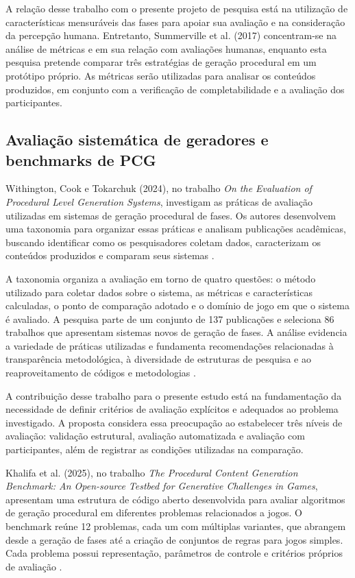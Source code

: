 A relação desse trabalho com o presente projeto de 
pesquisa está na utilização de características mensuráveis 
das fases para apoiar sua avaliação e na consideração 
da percepção humana. Entretanto, Summerville et al. (2017) 
concentram-se na análise de métricas e em sua relação com
avaliações humanas, enquanto esta pesquisa pretende comparar 
três estratégias de geração procedural em um protótipo próprio.
As métricas serão utilizadas para analisar os conteúdos
produzidos, em conjunto com a verificação de completabilidade 
e a avaliação dos participantes.

\subsection{Avaliação sistemática de geradores e benchmarks de PCG}

Withington, Cook e Tokarchuk (2024), no trabalho
\textit{On the Evaluation of Procedural Level Generation
Systems}, investigam as práticas de avaliação utilizadas em
sistemas de geração procedural de fases. Os autores
desenvolvem uma taxonomia para organizar essas práticas
e analisam publicações acadêmicas, buscando identificar 
como os pesquisadores coletam dados, caracterizam os
conteúdos produzidos e comparam seus sistemas 
\cite{Withington2024}.

A taxonomia organiza a avaliação em torno de quatro
questões: o método utilizado para coletar dados sobre
o sistema, as métricas e características calculadas,
o ponto de comparação adotado e o domínio de jogo
em que o sistema é avaliado. A pesquisa parte de um
conjunto de 137 publicações e seleciona 86 trabalhos
que apresentam sistemas novos de geração de fases.
A análise evidencia a variedade de práticas utilizadas
e fundamenta recomendações relacionadas à transparência
metodológica, à diversidade de estruturas de pesquisa
e ao reaproveitamento de códigos e metodologias
\cite{Withington2024}.

A contribuição desse trabalho para o presente estudo está
na fundamentação da necessidade de definir critérios de 
avaliação explícitos e adequados ao problema investigado. 
A proposta considera essa preocupação ao estabelecer três 
níveis de avaliação: validação estrutural, avaliação automatizada 
e avaliação com participantes, além de registrar as condições 
utilizadas na comparação.

Khalifa et al. (2025), no trabalho \textit{The Procedural
Content Generation Benchmark: An Open-source Testbed
for Generative Challenges in Games}, apresentam uma 
estrutura de código aberto desenvolvida para avaliar 
algoritmos de geração procedural em diferentes problemas 
relacionados a jogos. O benchmark reúne 12 problemas, cada 
um com múltiplas variantes, que abrangem desde a geração de 
fases até a criação de conjuntos de regras para jogos simples. 
Cada problema possui representação, parâmetros de controle
e critérios próprios de avaliação \cite{Khalifa2025}.

